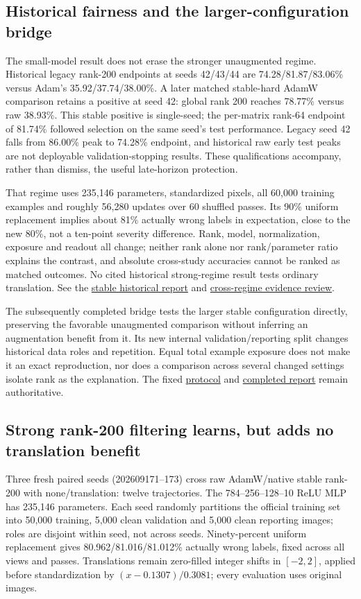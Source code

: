 \documentclass[10pt]{article}
\newcommand{\src}[2]{\href{../../../#1}{#2}}
\begin{document}
\newpage
\subsection{Historical fairness and the larger-configuration bridge}
The small-model result does not erase the stronger unaugmented regime. Historical legacy rank-200 endpoints at seeds 42/43/44 are 74.28/81.87/83.06\% versus Adam's 35.92/37.74/38.00\%. A later matched stable-hard AdamW comparison retains a positive at seed 42: global rank 200 reaches 78.77\% versus raw 38.93\%. This stable positive is single-seed; the per-matrix rank-64 endpoint of 81.74\% followed selection on the same seed's test performance. Legacy seed 42 falls from 86.00\% peak to 74.28\% endpoint, and historical raw early test peaks are not deployable validation-stopping results. These qualifications accompany, rather than dismiss, the useful late-horizon protection.

That regime uses 235,146 parameters, standardized pixels, all 60,000 training examples and roughly 56,280 updates over 60 shuffled passes. Its 90\% uniform replacement implies about 81\% actually wrong labels in expectation, close to the new 80\%, not a ten-point severity difference. Rank, model, normalization, exposure and readout all change; neither rank alone nor rank/parameter ratio explains the contrast, and absolute cross-study accuracies cannot be ranked as matched outcomes. No cited historical strong-regime result tests ordinary translation. See the \src{research/noisy_mnist_hard_curves.md}{stable historical report} and \src{output/2026-09-10-spectral-multiview-clean/regime-comparison.md}{cross-regime evidence review}.

The subsequently completed bridge tests the larger stable configuration directly, preserving the favorable unaugmented comparison without inferring an augmentation benefit from it. Its new internal validation/reporting split changes historical data roles and repetition. Equal total example exposure does not make it an exact reproduction, nor does a comparison across several changed settings isolate rank as the explanation. The fixed \src{output/2026-09-10-spectral-strong-augmentation/protocol.md}{protocol} and \src{output/2026-09-10-spectral-strong-augmentation/results.md}{completed report} remain authoritative.

\newpage
\subsection{Strong rank-200 filtering learns, but adds no translation benefit}\label{app:strong-augmentation}
Three fresh paired seeds (202609171--173) cross raw AdamW/native stable rank-200 with none/translation: twelve trajectories. The 784--256--128--10 ReLU MLP has 235,146 parameters. Each seed randomly partitions the official training set into 50,000 training, 5,000 clean validation and 5,000 clean reporting images; roles are disjoint within seed, not across seeds. Ninety-percent uniform replacement gives 80.962/81.016/81.012\% actually wrong labels, fixed across all views and passes. Translations remain zero-filled integer shifts in $[-2,2]$, applied before standardization by $(x-0.1307)/0.3081$; every evaluation uses original images.
\end{document}
